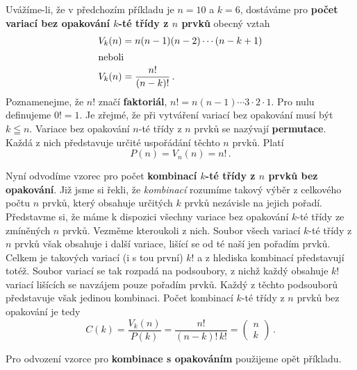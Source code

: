       Uvážíme-li, že v předchozím příkladu je \(n = 10\) a \(k = 6\), dostáváme pro \textbf{počet 
      variací bez opakování \(k\)-té třídy z \(n\) prvků} obecný vztah
      \begin{align}
        V_k(n) &= n(n-1)(n-2)\cdots(n-k+1)  \nonumber \\
        \shortintertext{neboli}
        V_k(n) &= \frac{n!}{(n-k)!}\, .    \label{mai:eq008}
      \end{align}
      Poznamenejme, že \(n!\) značí \textbf{faktoriál}, \(n! = n(n - 1)\cdots 3 \cdot 2 \cdot 1\). 
      Pro nulu definujeme \(0! = 1\). Je zřejmé, že při vytváření variací bez opakování musí být 
      \(k\leqq n\). Variace bez opakování \(n\)-té třídy z \(n\) prvků se nazývají 
      \textbf{permutace}. Každá z nich představuje určité uspořádání těchto \(n\) prvků. Platí
      \begin{equation}\label{mai:eq009}
        \boxed{P(n) = V_n(n) = n!}\, .
      \end{equation}
      
      Nyní odvodíme vzorec pro počet \textbf{kombinací \(k\)-té třídy z \(n\) prvků bez opakování}. 
      Již jsme si řekli, že \emph{kombinací} rozumíme takový výběr z celkového počtu \(n\) prvků, 
      který obsahuje určitých \(k\) prvků nezávisle na jejich pořadí. Představme si, že máme k 
      dispozici všechny variace bez opakování \(k\)-té třídy ze zmíněných \(n\) prvků. Vezměme 
      kteroukoli z nich. Soubor všech variací \(k\)-té třídy z \(n\) prvků však obsahuje i další 
      variace, lišící se od té naší jen pořadím prvků. Celkem je takových variací (i s tou první) 
      \(k!\) a z hlediska kombinací představují totéž. Soubor variací se tak rozpadá na podsoubory, 
      z nichž každý obsahuje \(k!\) variací lišících se navzájem pouze pořadím prvků. Každý z 
      těchto podsouborů představuje však jedinou kombinaci. Počet kombinací \(k\)-té třídy z \(n\) 
      prvků bez opakování je tedy
      \begin{equation}\label{mai:eq010}
        \boxed{C(k) = \frac{V_k(n)}{P(k)} = \frac{n!}{(n-k)!\,k!} = 
               \begin{pmatrix}
                n \\
                k
               \end{pmatrix}}\, .
      \end{equation}
      
      Pro odvození vzorce pro \textbf{kombinace s opakováním} použijeme opět příkladu.
      
      
